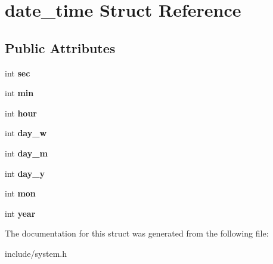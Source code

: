 \hypertarget{structdate__time}{}\section{date\+\_\+time Struct Reference}
\label{structdate__time}
\subsection*{Public Attributes}
\begin{DoxyCompactItemize}
\item 
int {\bfseries sec}\hypertarget{structdate__time_ac43a109ccc7f3c46840afa8a30dc51f1}{}\label{structdate__time_ac43a109ccc7f3c46840afa8a30dc51f1}

\item 
int {\bfseries min}\hypertarget{structdate__time_af93fdd2e01117a0171a2583718166d2a}{}\label{structdate__time_af93fdd2e01117a0171a2583718166d2a}

\item 
int {\bfseries hour}\hypertarget{structdate__time_a4331b46df7b89763a85ea97a246c4ee2}{}\label{structdate__time_a4331b46df7b89763a85ea97a246c4ee2}

\item 
int {\bfseries day\+\_\+w}\hypertarget{structdate__time_aa021771ff83fe860afaaf158932fcb15}{}\label{structdate__time_aa021771ff83fe860afaaf158932fcb15}

\item 
int {\bfseries day\+\_\+m}\hypertarget{structdate__time_a72ee4f3a6a9970e58861c868bc676ba2}{}\label{structdate__time_a72ee4f3a6a9970e58861c868bc676ba2}

\item 
int {\bfseries day\+\_\+y}\hypertarget{structdate__time_ad89b6054376708a35bc1c0a186c808ca}{}\label{structdate__time_ad89b6054376708a35bc1c0a186c808ca}

\item 
int {\bfseries mon}\hypertarget{structdate__time_a6e8a5baa74a619330ba9925cf0baf250}{}\label{structdate__time_a6e8a5baa74a619330ba9925cf0baf250}

\item 
int {\bfseries year}\hypertarget{structdate__time_ae96e2e4cc09780eaac04038e12bbe06b}{}\label{structdate__time_ae96e2e4cc09780eaac04038e12bbe06b}

\end{DoxyCompactItemize}


The documentation for this struct was generated from the following file\+:\begin{DoxyCompactItemize}
\item 
include/system.\+h\end{DoxyCompactItemize}
